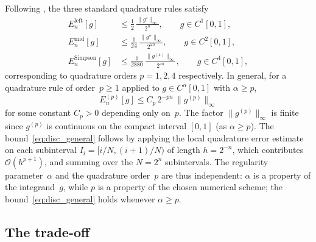 \documentclass[12pt,a4paper]{article}
\theoremstyle{plain}
\theoremstyle{definition}
\theoremstyle{remark}
\begin{document}
Following \cite{CarreraVazquezWoerner2020},
the three standard quadrature rules satisfy
\begin{align}
  E_n^{\mathrm{left}}[g] &\leq \frac{1}{2}\,
    \frac{\|g'\|_\infty}{2^n},
    \qquad g\in C^1[0,1],
    \label{eq:error_left}\\
  E_n^{\mathrm{mid}}[g] &\leq \frac{1}{24}\,
    \frac{\|g''\|_\infty}{2^{2n}},
    \qquad g\in C^2[0,1],
    \label{eq:error_mid}\\
  E_n^{\mathrm{Simpson}}[g] &\leq \frac{1}{2880}\,
    \frac{\|g^{(4)}\|_\infty}{2^{4n}},
    \qquad g\in C^4[0,1],
    \label{eq:error_simp}
\end{align}
corresponding to quadrature orders $p=1,2,4$ respectively.
In general, for a quadrature rule of order~$p\geq 1$ applied to
$g\in C^\alpha[0,1]$ with $\alpha\geq p$,
\begin{equation}
  E_n^{(p)}[g] \leq C_p\,2^{-pn}\,\|g^{(p)}\|_\infty
  \label{eq:disc_general}
\end{equation}
for some constant $C_p>0$ depending only on~$p$.
The factor $\|g^{(p)}\|_\infty$ is finite since $g^{(p)}$
is continuous on the compact interval $[0,1]$ (as $\alpha\geq p$).
The bound~\eqref{eq:disc_general} follows by applying the local
quadrature error estimate on each subinterval $I_i=[i/N,(i+1)/N)$
of length $h=2^{-n}$, which contributes $\mathcal{O}(h^{p+1})$,
and summing over the $N=2^n$ subintervals.
The regularity parameter~$\alpha$ and the quadrature order~$p$ are
thus independent: $\alpha$ is a property of the integrand~$g$,
while $p$ is a property of the chosen numerical scheme;
the bound~\eqref{eq:disc_general} holds whenever $\alpha\geq p$.

\subsection{The trade-off}
\end{document}
